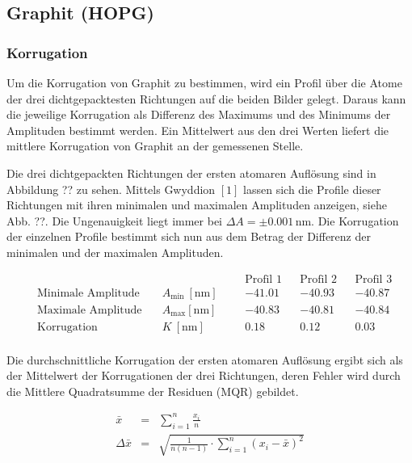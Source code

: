\documentclass[12pt,a4paper]{scrartcl}
\numberwithin{equation}{section} %
\renewcommand{\[}{} %
\renewcommand{\]}{\noindent} %
\begin{document}
\hypertarget{graphit-hopg}{%
\subsection{Graphit (HOPG)}\label{graphit-hopg}}

\hypertarget{korrugation}{%
\subsubsection{Korrugation}\label{korrugation}}

Um die Korrugation von Graphit zu bestimmen, wird ein Profil über die
Atome der drei dichtgepacktesten Richtungen auf die beiden Bilder
gelegt. Daraus kann die jeweilige Korrugation als Differenz des Maximums
und des Minimums der Amplituden bestimmt werden. Ein Mittelwert aus den
drei Werten liefert die mittlere Korrugation von Graphit an der
gemessenen Stelle.

Die drei dichtgepackten Richtungen der ersten atomaren Auflösung sind in
Abbildung ?? zu sehen. Mittels Gwyddion \([1]\) lassen sich die Profile
dieser Richtungen mit ihren minimalen und maximalen Amplituden anzeigen,
siehe Abb. ??. Die Ungenauigkeit liegt immer bei
\(\Delta A = \pm 0.001 \mathrm{\,nm}\). Die Korrugation der einzelnen
Profile bestimmt sich nun aus dem Betrag der Differenz der minimalen und
der maximalen Amplituden.

\[
\begin{align*}
    &&&&& \text{Profil 1}&& \text{Profil 2} && \text{Profil 3} \\
    &\text{Minimale Amplitude}\quad &A_\mathrm{min}\ [\mathrm{nm}] &&
        & -41.01 && -40.93 && -40.87 \\
    &\text{Maximale Amplitude}\quad &A_\mathrm{max} [\mathrm{nm}] &&
        & -40.83 && -40.81 && -40.84 \\
    &\text{Korrugation} &K\ [\mathrm{nm}] &&
        & 0.18 && 0.12 && 0.03 \\
\end{align*}
\]

Die durchschnittliche Korrugation der ersten atomaren Auflösung ergibt
sich als der Mittelwert der Korrugationen der drei Richtungen, deren
Fehler wird durch die Mittlere Quadratsumme der Residuen (MQR) gebildet.

\[
\begin{eqnarray}
    \bar{x} &=& \sum_{i=1}^n \frac{x_i}{n} \\
    \Delta \bar{x} &=& \sqrt{\frac{1}{n (n-1)} \cdot \sum_{i=1}^{n} (x_i -\bar{x})^2}
\end{eqnarray}
\]
\end{document}
